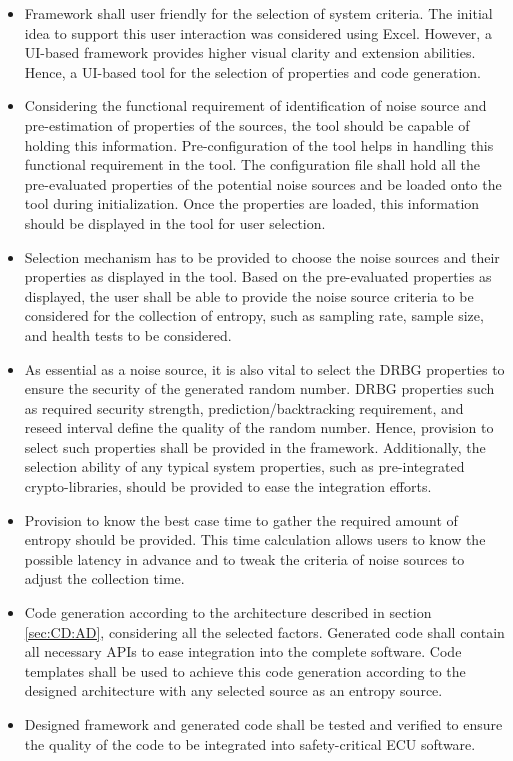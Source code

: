 \begin{itemize}
	
	\item Framework shall user friendly for the selection of system criteria. The initial idea to support this user interaction was considered using Excel. However, a UI-based framework provides higher visual clarity and extension abilities. Hence, a UI-based tool for the selection of properties and code generation. 
	
	\item Considering the functional requirement of identification of noise source and pre-estimation of properties of the sources, the tool should be capable of holding this information. Pre-configuration of the tool helps in handling this functional requirement in the tool. The configuration file shall hold all the pre-evaluated properties of the potential noise sources and be loaded onto the tool during initialization. Once the properties are loaded, this information should be displayed in the tool for user selection.
		
	\item Selection mechanism has to be provided to choose the noise sources and their properties as displayed in the tool. Based on the pre-evaluated properties as displayed, the user shall be able to provide the noise source criteria to be considered for the collection of entropy, such as sampling rate, sample size, and health tests to be considered. 
	
	\item As essential as a noise source, it is also vital to select the DRBG properties to ensure the security of the generated random number. DRBG properties such as required security strength, prediction/backtracking requirement, and reseed interval define the quality of the random number. Hence, provision to select such properties shall be provided in the framework. Additionally, the selection ability of any typical system properties, such as pre-integrated crypto-libraries, should be provided to ease the integration efforts.
		
	\item Provision to know the best case time to gather the required amount of entropy should be provided. This time calculation allows users to know the possible latency in advance and to tweak the criteria of noise sources to adjust the collection time. 
	
	\item Code generation according to the architecture described in section \ref{sec:CD:AD}, considering all the selected factors. Generated code shall contain all necessary APIs to ease integration into the complete software. Code templates shall be used to achieve this code generation according to the designed architecture with any selected source as an entropy source.  
	
	\item Designed framework and generated code shall be tested and verified to ensure the quality of the code to be integrated into safety-critical ECU software.	
	
\end{itemize}


